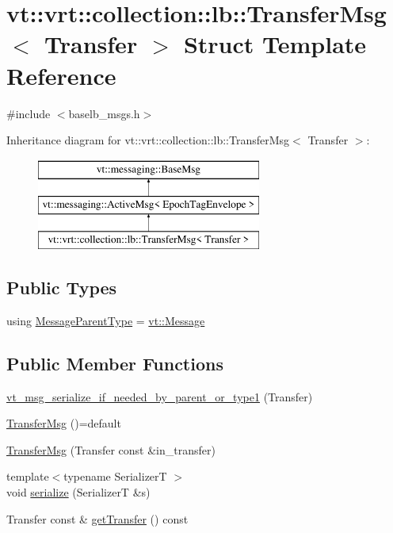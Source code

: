 \hypertarget{structvt_1_1vrt_1_1collection_1_1lb_1_1_transfer_msg}{}\section{vt\+:\+:vrt\+:\+:collection\+:\+:lb\+:\+:Transfer\+Msg$<$ Transfer $>$ Struct Template Reference}
\label{structvt_1_1vrt_1_1collection_1_1lb_1_1_transfer_msg}


{\ttfamily \#include $<$baselb\+\_\+msgs.\+h$>$}

Inheritance diagram for vt\+:\+:vrt\+:\+:collection\+:\+:lb\+:\+:Transfer\+Msg$<$ Transfer $>$\+:\begin{figure}[H]
\begin{center}
\leavevmode
\includegraphics[height=3.000000cm]{structvt_1_1vrt_1_1collection_1_1lb_1_1_transfer_msg}
\end{center}
\end{figure}
\subsection*{Public Types}
\begin{DoxyCompactItemize}
\item 
using \hyperlink{structvt_1_1vrt_1_1collection_1_1lb_1_1_transfer_msg_a7bbde6f5de84e4616188963323d473ca}{Message\+Parent\+Type} = \hyperlink{namespacevt_a3a3ddfef40b4c90915fa43cdd5f129ea}{vt\+::\+Message}
\end{DoxyCompactItemize}
\subsection*{Public Member Functions}
\begin{DoxyCompactItemize}
\item 
\hyperlink{structvt_1_1vrt_1_1collection_1_1lb_1_1_transfer_msg_a5ff4c5168e29e0ad67c32fa197eb048d}{vt\+\_\+msg\+\_\+serialize\+\_\+if\+\_\+needed\+\_\+by\+\_\+parent\+\_\+or\+\_\+type1} (Transfer)
\item 
\hyperlink{structvt_1_1vrt_1_1collection_1_1lb_1_1_transfer_msg_ad94fef4d81e901de07019aa41718c516}{Transfer\+Msg} ()=default
\item 
\hyperlink{structvt_1_1vrt_1_1collection_1_1lb_1_1_transfer_msg_a3f2753a92fc1d0fa93489b9adf102533}{Transfer\+Msg} (Transfer const \&in\+\_\+transfer)
\item 
{\footnotesize template$<$typename SerializerT $>$ }\\void \hyperlink{structvt_1_1vrt_1_1collection_1_1lb_1_1_transfer_msg_a230421d821c61d152b596b6c024010fd}{serialize} (SerializerT \&s)
\item 
Transfer const  \& \hyperlink{structvt_1_1vrt_1_1collection_1_1lb_1_1_transfer_msg_a9c93bf7d69be7e2bff65999cc4fadf98}{get\+Transfer} () const
\end{DoxyCompactItemize}
